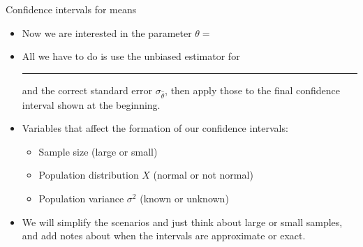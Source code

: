 \documentclass{article}
\newcommand{\blankul}[1]{\rule[-1.5mm]{#1}{0.15mm}}	%
\begin{document}
Confidence intervals for means\bigskip
\begin{itemize}
    \item Now we are interested in the parameter $\theta = $
    \item[] All we have to do is use the unbiased estimator for \blankul{2cm} and the correct standard error $\sigma_{\hat{\theta}}$, then apply those to the final confidence interval shown at the beginning.
    \item Variables that affect the formation of our confidence intervals:
    \begin{itemize}
        \item Sample size (large or small)
        \item Population distribution $X$ (normal or not normal)
        \item Population variance $\sigma^2$ (known or unknown)
    \end{itemize}
    \item We will simplify the scenarios and just think about large or small samples, and add notes about when the intervals are approximate or exact.
\end{itemize}\bigskip
\end{document}
